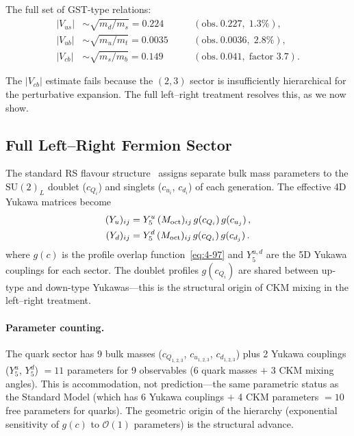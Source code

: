 The full set of GST-type relations:
\begin{equation}
\begin{aligned}
  |V_{us}| &\sim \sqrt{m_d/m_s} = 0.224 \quad &&(\mathrm{obs.\ }0.227,\; 1.3\%),\\
  |V_{ub}| &\sim \sqrt{m_u/m_t} = 0.0035 \quad &&(\mathrm{obs.\ }0.0036,\; 2.8\%),\\
  |V_{cb}| &\sim \sqrt{m_s/m_b} = 0.149 \quad &&(\mathrm{obs.\ }0.041,\; \text{factor 3.7}).
\end{aligned}
  \label{eq:4-102}
\end{equation}

The $|V_{cb}|$ estimate fails because the $(2,3)$ sector is insufficiently hierarchical for the perturbative expansion. The full left--right treatment resolves this, as we now show.

\subsection{Full Left--Right Fermion Sector}
\label{sec:4-lr-fermions}

The standard RS flavour structure~\cite{ch4:GherghettaPomarol2000,ch4:Casagrande2008,ch4:AgashePerezSoni2005,ch4:Huber2003} assigns separate bulk mass parameters to the $\mathrm{SU}(2)_L$ doublet ($c_{Q_i}$) and singlets ($c_{u_i}$, $c_{d_i}$) of each generation. The effective 4D Yukawa matrices become
\begin{align}
  (Y_u)_{ij} &= Y_5^u\, (M_{\mathrm{oct}})_{ij}\, g(c_{Q_i})\, g(c_{u_j})\,,\label{eq:4-yukawa-LR}\\
  (Y_d)_{ij} &= Y_5^d\, (M_{\mathrm{oct}})_{ij}\, g(c_{Q_i})\, g(c_{d_j})\,.\notag
\end{align}
where $g(c)$ is the profile overlap function~\eqref{eq:4-97} and $Y_5^{u,d}$ are the 5D Yukawa couplings for each sector. The doublet profiles $g(c_{Q_i})$ are shared between up-type and down-type Yukawas---this is the structural origin of CKM mixing in the left--right treatment.

\paragraph{Parameter counting.} The quark sector has 9 bulk masses ($c_{Q_{1,2,3}}$, $c_{u_{1,2,3}}$, $c_{d_{1,2,3}}$) plus 2 Yukawa couplings ($Y_5^u$, $Y_5^d$) $= 11$ parameters for 9 observables (6 quark masses $+$ 3 CKM mixing angles). This is accommodation, not prediction---the same parametric status as the Standard Model (which has 6 Yukawa couplings $+$ 4 CKM parameters $= 10$ free parameters for quarks). The geometric origin of the hierarchy (exponential sensitivity of $g(c)$ to $\mathcal{O}(1)$ parameters) is the structural advance.

